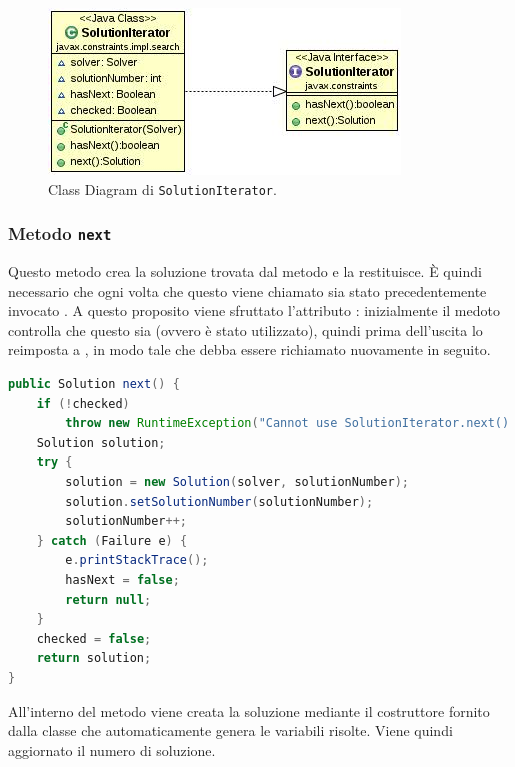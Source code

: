 \begin{figure}[!ht]\label{solutioniteratorUML}
\centering
\includegraphics[scale=.75]{img/SolutionIterator.JPG}
\caption{Class Diagram di \texttt{SolutionIterator}.}
\end{figure}

\subsubsection{Metodo \texttt{next}}
Questo metodo crea la soluzione trovata dal metodo  e la
restituisce. \`E quindi necessario che ogni volta che questo viene chiamato
sia stato precedentemente invocato . A questo proposito
viene sfruttato l'attributo : inizialmente il medoto controlla
che questo sia  (ovvero  è stato utilizzato),
quindi prima dell'uscita lo reimposta a , in modo tale che
 debba essere richiamato nuovamente in seguito.

\begin{lstlisting}[language = Java,
                   caption = \files{next}.]
public Solution next() {
	if (!checked)
		throw new RuntimeException("Cannot use SolutionIterator.next() " + "before checking the hasNext() returned true");
	Solution solution;
	try {
		solution = new Solution(solver, solutionNumber);
		solution.setSolutionNumber(solutionNumber);
		solutionNumber++;
	} catch (Failure e) {
		e.printStackTrace();
		hasNext = false;
		return null;
	}
	checked = false;
	return solution;
}
\end{lstlisting}
All'interno del metodo viene creata la soluzione mediante il costruttore
fornito dalla classe  che automaticamente genera
le variabili risolte. Viene quindi aggiornato il numero di soluzione.


